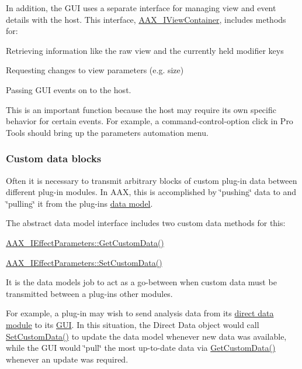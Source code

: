 In addition, the G\+U\+I uses a separate interface for managing view and event details with the host. This interface, \hyperlink{a00117}{A\+A\+X\+\_\+\+I\+View\+Container}, includes methods for\+:
\begin{DoxyItemize}
\item Retrieving information like the raw view and the currently held modifier keys
\item Requesting changes to view parameters (e.\+g. size)
\item Passing G\+U\+I events on to the host.
\begin{DoxyItemize}
\item This is an important function because the host may require its own specific behavior for certain events. For example, a command-\/control-\/option click in Pro Tools should bring up the parameter\textquotesingle{}s automation menu.
\end{DoxyItemize}
\end{DoxyItemize}\hypertarget{a00330_CommonInterface_Communication_hostmodules_customdata}{}\subsubsection{Custom data blocks}\label{a00330_CommonInterface_Communication_hostmodules_customdata}
Often it is necessary to transmit arbitrary blocks of custom plug-\/in data between different plug-\/in modules. In A\+A\+X, this is accomplished by \char`\"{}pushing\char`\"{} data to and \char`\"{}pulling\char`\"{} it from the plug-\/in\textquotesingle{}s \hyperlink{a00328}{data model}.

The abstract data model interface includes two custom data methods for this\+: \begin{DoxyItemize}
\item \hyperlink{a00061_a4728fcad006d921a07489144360f447e}{A\+A\+X\+\_\+\+I\+Effect\+Parameters\+::\+Get\+Custom\+Data()} \item \hyperlink{a00061_aa838cad04781853ef2e0b9df22a05170}{A\+A\+X\+\_\+\+I\+Effect\+Parameters\+::\+Set\+Custom\+Data()}\end{DoxyItemize}
It is the data model\textquotesingle{}s job to act as a go-\/between when custom data must be transmitted between a plug-\/in\textquotesingle{}s other modules.

For example, a plug-\/in may wish to send analysis data from its \hyperlink{a00333}{direct data module} to its \hyperlink{a00329}{G\+U\+I}. In this situation, the Direct Data object would call \hyperlink{a00061_aa838cad04781853ef2e0b9df22a05170}{Set\+Custom\+Data()} to update the data model whenever new data was available, while the G\+U\+I would \char`\"{}pull\char`\"{} the most up-\/to-\/date data via \hyperlink{a00061_a4728fcad006d921a07489144360f447e}{Get\+Custom\+Data()} whenever an update was required.

